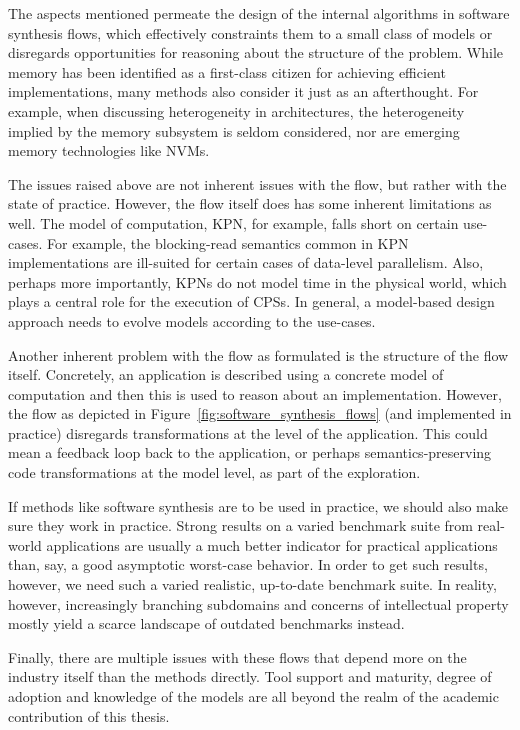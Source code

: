 The aspects mentioned permeate the design of the internal algorithms in software synthesis flows, which effectively constraints them to a small class of models or disregards opportunities for reasoning about the structure of the problem. 
While memory has been identified as a first-class citizen for achieving efficient implementations, many methods also consider it just as an afterthought.
For example, when discussing heterogeneity in architectures, the heterogeneity implied by the memory subsystem is seldom considered, nor are emerging memory technologies like \acp{NVM}.

The issues raised above are not inherent issues with the flow, but rather with the state of practice.
However, the flow itself does has some inherent limitations as well.
The model of computation, \ac{KPN}, for example, falls short on certain use-cases.
For example, the blocking-read semantics common in \ac{KPN} implementations are ill-suited for certain cases of data-level parallelism.
Also, perhaps more importantly, \acp{KPN} do not model time in the physical world, which plays a central role for the execution of \acp{CPS}.
In general, a model-based design approach needs to evolve models according to the use-cases.

Another inherent problem with the flow as formulated is the structure of the flow itself.
Concretely, an application is described using a concrete model of computation and then this is used to reason about an implementation.
However, the flow as depicted in Figure~\ref{fig:software_synthesis_flows} (and implemented in practice) disregards transformations at the level of the application.
This could mean a feedback loop back to the application, or perhaps semantics-preserving code transformations at the model level, as part of the exploration.

If methods like software synthesis are to be used in practice, we should also make sure they work in practice. 
Strong results on a varied benchmark suite from real-world applications are usually a much better indicator for practical applications than, say, a good asymptotic worst-case behavior.
In order to get such results, however, we need such a varied realistic, up-to-date benchmark suite.
In reality, however, increasingly branching subdomains and concerns of intellectual property mostly yield a scarce landscape of outdated benchmarks instead.

Finally, there are multiple issues with these flows that depend more on the industry itself than the methods directly.
Tool support and maturity, degree of adoption and knowledge of the models are all beyond the realm of the academic contribution of this thesis.

